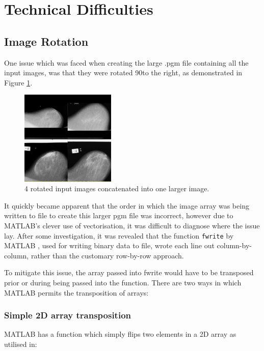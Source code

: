 \section{Technical Difficulties}

\subsection{Image Rotation}
\label{ssec:trans}

One issue which was faced when creating the large .pgm file containing all the input images, was that they were rotated 90\degree to the right, as demonstrated in Figure \ref{fig:rotated-input}.

\begin{figure}[H]
  \centering
  \includegraphics[width=0.4\textwidth]{Chapter2/technical-img/rotation.png}
  \caption{4 rotated input images concatenated into one larger image.}
  \label{fig:rotated-input}
\end{figure}

It quickly became apparent that the order in which the image array was being written to file to create this larger pgm file was incorrect, however due to MATLAB's clever use of vectorisation, it was difficult to diagnose where the issue lay. After some investigation, it was revealed that the function \texttt{fwrite} by MATLAB \cite{fwrite}, used for writing binary data to file, wrote each line out column-by-column, rather than the customary row-by-row approach.

To mitigate this issue, the array passed into fwrite would have to be transposed prior or during being passed into the function. There are two ways in which MATLAB permits the \gls{transposition} of arrays:

\subsubsection{Simple 2D array transposition}

MATLAB has a  function which simply flips two elements in a 2D array as utilised in:

